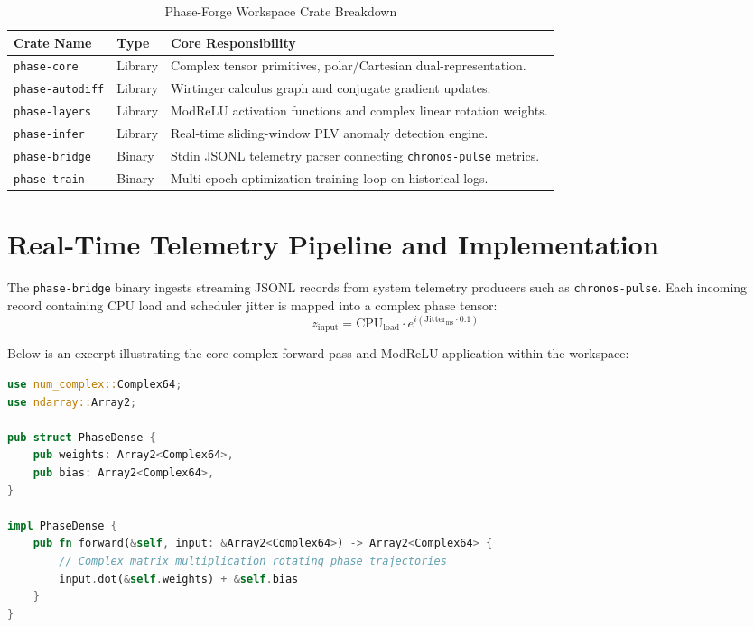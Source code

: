 \documentclass[11pt,a4paper]{article}
\begin{document}
\begin{table}[h]
\centering
\begin{tabular}{llp{7.5cm}}
\toprule
\textbf{Crate Name} & \textbf{Type} & \textbf{Core Responsibility} \\
\midrule
\texttt{phase-core} & Library & Complex tensor primitives, polar/Cartesian dual-representation. \\
\texttt{phase-autodiff} & Library & Wirtinger calculus graph and conjugate gradient updates. \\
\texttt{phase-layers} & Library & ModReLU activation functions and complex linear rotation weights. \\
\texttt{phase-infer} & Library & Real-time sliding-window PLV anomaly detection engine. \\
\texttt{phase-bridge} & Binary & Stdin JSONL telemetry parser connecting \texttt{chronos-pulse} metrics. \\
\texttt{phase-train} & Binary & Multi-epoch optimization training loop on historical logs. \\
\bottomrule
\end{tabular}
\caption{Phase-Forge Workspace Crate Breakdown}
\label{tab:crates}
\end{table}

\section{Real-Time Telemetry Pipeline and Implementation}
The \texttt{phase-bridge} binary ingests streaming JSONL records from system telemetry producers such as \texttt{chronos-pulse}. Each incoming record containing CPU load and scheduler jitter is mapped into a complex phase tensor:
\begin{equation}
z_{\text{input}} = \text{CPU}_{\text{load}} \cdot e^{i (\text{Jitter}_{\text{ms}} \cdot 0.1)}
\end{equation}

Below is an excerpt illustrating the core complex forward pass and ModReLU application within the workspace:

\begin{lstlisting}[language=Rust, caption={Complex Forward Pass and ModReLU in Phase-Forge}]
use num_complex::Complex64;
use ndarray::Array2;

pub struct PhaseDense {
    pub weights: Array2<Complex64>,
    pub bias: Array2<Complex64>,
}

impl PhaseDense {
    pub fn forward(&self, input: &Array2<Complex64>) -> Array2<Complex64> {
        // Complex matrix multiplication rotating phase trajectories
        input.dot(&self.weights) + &self.bias
    }
}
\end{lstlisting}
\end{document}
